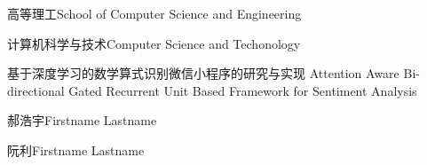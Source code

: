 
\school
{高等理工}{School of Computer Science and Engineering}

\major
{计算机科学与技术}{Computer Science and Techonology}

\thesistitle
{基于深度学习的数学算式识别微信小程序的研究与实现}
{}
{Attention Aware Bi-directional Gated Recurrent Unit Based Framework for Sentiment Analysis}
{}

\thesisauthor
{郝浩宇}{Firstname Lastname}

\teacher
{阮利}{Firstname Lastname}






